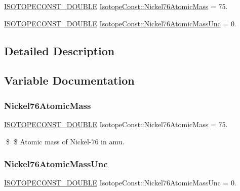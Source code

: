 \begin{DoxyCompactItemize}
\item 
\mbox{\hyperlink{group___isotope_const-_macros_ga8f45a7272ce02c0b4c65c44636ed719a}{I\+S\+O\+T\+O\+P\+E\+C\+O\+N\+S\+T\+\_\+\+D\+O\+U\+B\+LE}} \mbox{\hyperlink{group___isotope_const-_nickel-_ni76_gad60f4f908f4fee7fac5bcd728ed1e23c}{Isotope\+Const\+::\+Nickel76\+Atomic\+Mass}} = 75.
\item 
\mbox{\hyperlink{group___isotope_const-_macros_ga8f45a7272ce02c0b4c65c44636ed719a}{I\+S\+O\+T\+O\+P\+E\+C\+O\+N\+S\+T\+\_\+\+D\+O\+U\+B\+LE}} \mbox{\hyperlink{group___isotope_const-_nickel-_ni76_ga84fb9fa4633524ed5e2322ea69f71496}{Isotope\+Const\+::\+Nickel76\+Atomic\+Mass\+Unc}} = 0.
\end{DoxyCompactItemize}


\subsection{Detailed Description}


\subsection{Variable Documentation}
\mbox{\label{group___isotope_const-_nickel-_ni76_gad60f4f908f4fee7fac5bcd728ed1e23c}} 
\subsubsection{\texorpdfstring{Nickel76\+Atomic\+Mass}{Nickel76AtomicMass}}
{\footnotesize\ttfamily \mbox{\hyperlink{group___isotope_const-_macros_ga8f45a7272ce02c0b4c65c44636ed719a}{I\+S\+O\+T\+O\+P\+E\+C\+O\+N\+S\+T\+\_\+\+D\+O\+U\+B\+LE}} Isotope\+Const\+::\+Nickel76\+Atomic\+Mass = 75.}

\$ \$ Atomic mass of Nickel-\/76 in amu. \mbox{\label{group___isotope_const-_nickel-_ni76_ga84fb9fa4633524ed5e2322ea69f71496}} 
\subsubsection{\texorpdfstring{Nickel76\+Atomic\+Mass\+Unc}{Nickel76AtomicMassUnc}}
{\footnotesize\ttfamily \mbox{\hyperlink{group___isotope_const-_macros_ga8f45a7272ce02c0b4c65c44636ed719a}{I\+S\+O\+T\+O\+P\+E\+C\+O\+N\+S\+T\+\_\+\+D\+O\+U\+B\+LE}} Isotope\+Const\+::\+Nickel76\+Atomic\+Mass\+Unc = 0.}

